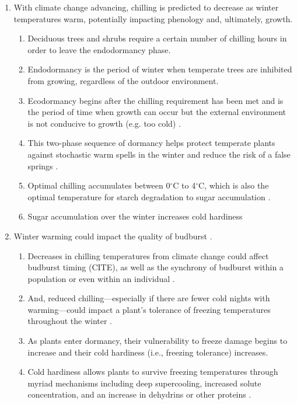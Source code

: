 \documentclass{article}\usepackage[]{graphicx}\usepackage[]{color}
\begin{document}
\begin{enumerate}
\item With climate change advancing, chilling is predicted to decrease as winter temperatures warm, potentially impacting phenology and, ultimately, growth.
  \begin{enumerate}
  \item Deciduous trees and shrubs require a certain number of chilling hours in order to leave the endodormancy phase. 
  \item Endodormancy is the period of winter when temperate trees are inhibited from growing, regardless of the outdoor environment. 
  \item Ecodormancy begins after the chilling requirement has been met and is the period of time when growth can occur but the external environment is not conducive to growth (e.g. too cold) \citep{Basler2012}. 
  \item This two-phase sequence of dormancy helps protect temperate plants against stochastic warm spells in the winter and reduce the risk of a false springs \citep{Basler2014}.
  \item Optimal chilling accumulates between 0$^{\circ}$C to 4$^{\circ}$C, which is also the optimal temperature for starch degradation to sugar accumulation \citep{Tixier2019}.
  \item Sugar accumulation over the winter increases cold hardiness 
  \end{enumerate}

\item Winter warming could impact the quality of budburst \citep{Bonhomme2010}.
  \begin{enumerate}
  \item Decreases in chilling temperatures from climate change could affect budburst timing (CITE), as well as the synchrony of budburst within a population or even within an individual \citep{Sanzperez2009}.
  \item And, reduced chilling---especially if there are fewer cold nights with warming---could impact a plant's tolerance of freezing temperatures throughout the winter \citep{Charrier2011}.
  \item As plants enter dormancy, their vulnerability to freeze damage begins to increase and their cold hardiness (i.e., freezing tolerance) increases. 
  \item Cold hardiness allows plants to survive freezing temperatures through myriad mechanisms including deep supercooling, increased solute concentration, and an increase in dehydrins or other proteins \citep{Sakai1987, Strimbeck2015}.
  \end{enumerate}
  


\end{enumerate}
\end{document}
